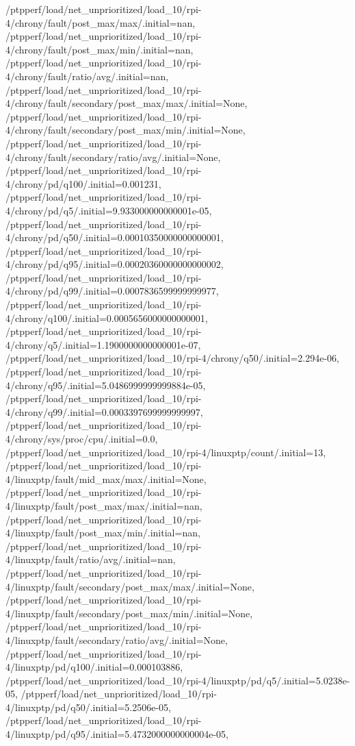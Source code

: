 {    /ptpperf/load/net_unprioritized/load_10/rpi-4/chrony/fault/post_max/max/.initial=nan,
    /ptpperf/load/net_unprioritized/load_10/rpi-4/chrony/fault/post_max/min/.initial=nan,
    /ptpperf/load/net_unprioritized/load_10/rpi-4/chrony/fault/ratio/avg/.initial=nan,
    /ptpperf/load/net_unprioritized/load_10/rpi-4/chrony/fault/secondary/post_max/max/.initial=None,
    /ptpperf/load/net_unprioritized/load_10/rpi-4/chrony/fault/secondary/post_max/min/.initial=None,
    /ptpperf/load/net_unprioritized/load_10/rpi-4/chrony/fault/secondary/ratio/avg/.initial=None,
    /ptpperf/load/net_unprioritized/load_10/rpi-4/chrony/pd/q100/.initial=0.001231,
    /ptpperf/load/net_unprioritized/load_10/rpi-4/chrony/pd/q5/.initial=9.933000000000001e-05,
    /ptpperf/load/net_unprioritized/load_10/rpi-4/chrony/pd/q50/.initial=0.00010350000000000001,
    /ptpperf/load/net_unprioritized/load_10/rpi-4/chrony/pd/q95/.initial=0.00020360000000000002,
    /ptpperf/load/net_unprioritized/load_10/rpi-4/chrony/pd/q99/.initial=0.0007836599999999977,
    /ptpperf/load/net_unprioritized/load_10/rpi-4/chrony/q100/.initial=0.0005656000000000001,
    /ptpperf/load/net_unprioritized/load_10/rpi-4/chrony/q5/.initial=1.1900000000000001e-07,
    /ptpperf/load/net_unprioritized/load_10/rpi-4/chrony/q50/.initial=2.294e-06,
    /ptpperf/load/net_unprioritized/load_10/rpi-4/chrony/q95/.initial=5.0486999999999884e-05,
    /ptpperf/load/net_unprioritized/load_10/rpi-4/chrony/q99/.initial=0.0003397699999999997,
    /ptpperf/load/net_unprioritized/load_10/rpi-4/chrony/sys/proc/cpu/.initial=0.0,
    /ptpperf/load/net_unprioritized/load_10/rpi-4/linuxptp/count/.initial=13,
    /ptpperf/load/net_unprioritized/load_10/rpi-4/linuxptp/fault/mid_max/max/.initial=None,
    /ptpperf/load/net_unprioritized/load_10/rpi-4/linuxptp/fault/post_max/max/.initial=nan,
    /ptpperf/load/net_unprioritized/load_10/rpi-4/linuxptp/fault/post_max/min/.initial=nan,
    /ptpperf/load/net_unprioritized/load_10/rpi-4/linuxptp/fault/ratio/avg/.initial=nan,
    /ptpperf/load/net_unprioritized/load_10/rpi-4/linuxptp/fault/secondary/post_max/max/.initial=None,
    /ptpperf/load/net_unprioritized/load_10/rpi-4/linuxptp/fault/secondary/post_max/min/.initial=None,
    /ptpperf/load/net_unprioritized/load_10/rpi-4/linuxptp/fault/secondary/ratio/avg/.initial=None,
    /ptpperf/load/net_unprioritized/load_10/rpi-4/linuxptp/pd/q100/.initial=0.000103886,
    /ptpperf/load/net_unprioritized/load_10/rpi-4/linuxptp/pd/q5/.initial=5.0238e-05,
    /ptpperf/load/net_unprioritized/load_10/rpi-4/linuxptp/pd/q50/.initial=5.2506e-05,
    /ptpperf/load/net_unprioritized/load_10/rpi-4/linuxptp/pd/q95/.initial=5.4732000000000004e-05,
}
